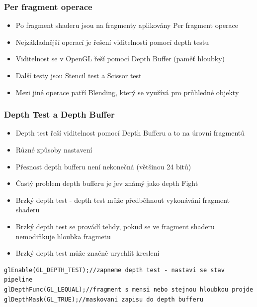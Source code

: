 
\begin{frame}[fragile]
\frametitle{Per fragment operace}
  \begin{itemize}
  \item Po fragment shaderu jsou na fragmenty aplikovány Per fragment operace
  \item Nejzákladnější operací je řešení viditelnosti pomocí depth testu
  \item Viditelnost se v OpenGL řeší pomocí Depth Buffer (paměť hloubky)
  \item Další testy jsou Stencil test a Scissor test
  \item Mezi jiné operace patří Blending, který se využívá pro průhledné objekty
  \end{itemize}
\end{frame}


\begin{frame}[fragile]
\frametitle{Depth Test a Depth Buffer}
  \begin{itemize}
  \item Depth test řeší viditelnost pomocí Depth Bufferu a to na úrovni fragmentů
  \item Různé způsoby nastavení
  \item Přesnost depth bufferu není nekonečná (většinou 24 bitů)
  \item Častý problem depth bufferu je jev známý jako depth Fight
  \item Brzký depth test - depth test může předběhnout vykonávání fragment shaderu
  \item Brzký depth test se provádí tehdy, pokud se ve fragment shaderu nemodifikuje hloubka fragmetu
  \item Brzký depth test může značně urychlit kreslení
  \end{itemize}
  {\scriptsize
\begin{verbatim}
glEnable(GL_DEPTH_TEST);//zapneme depth test - nastavi se stav pipeline
glDepthFunc(GL_LEQUAL);//fragment s mensi nebo stejnou hloubkou projde
glDepthMask(GL_TRUE);//maskovani zapisu do depth bufferu
  \end{verbatim}
  }
\end{frame}

